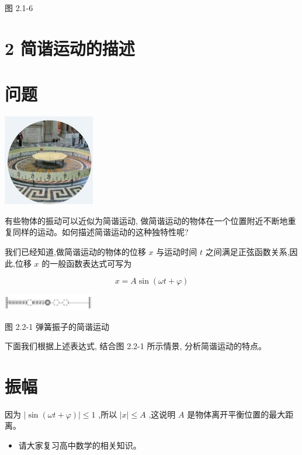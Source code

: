 \documentclass[10pt]{article}
\begin{document}
图 2.1-6

\section*{2 简谐运动的描述}

\section*{问题}

\begin{center}
\includegraphics[max width=0.3\textwidth]{images/01910e4c-ebb8-7d2c-8f2f-2375bc1d2d12_41_926576.jpg}
\end{center}

有些物体的振动可以近似为简谐运动, 做简谐运动的物体在一个位置附近不断地重复同样的运动。如何描述简谐运动的这种独特性呢?

我们已经知道,做简谐运动的物体的位移 \(x\) 与运动时间 \(t\) 之间满足正弦函数关系,因此,位移 \(x\) 的一般函数表达式可写为

\[
x = A\sin \left( {{\omega t} + \varphi }\right)
\]

\begin{center}
\includegraphics[max width=0.3\textwidth]{images/01910e4c-ebb8-7d2c-8f2f-2375bc1d2d12_41_635017.jpg}
\end{center}

图 2.2-1 弹簧振子的简谐运动

下面我们根据上述表达式, 结合图 2.2-1 所示情景, 分析简谐运动的特点。

\section*{振幅}

因为 \(\left| {\sin \left( {{\omega t} + \varphi }\right) }\right| \leq 1\) ,所以 \(\left| x\right| \leq A\) ,这说明 \(A\) 是物体离开平衡位置的最大距离。

\begin{mdframed}

\begin{itemize}
\item 请大家复习高中数学的相关知识。
\end{itemize}

\end{mdframed}
\end{document}
